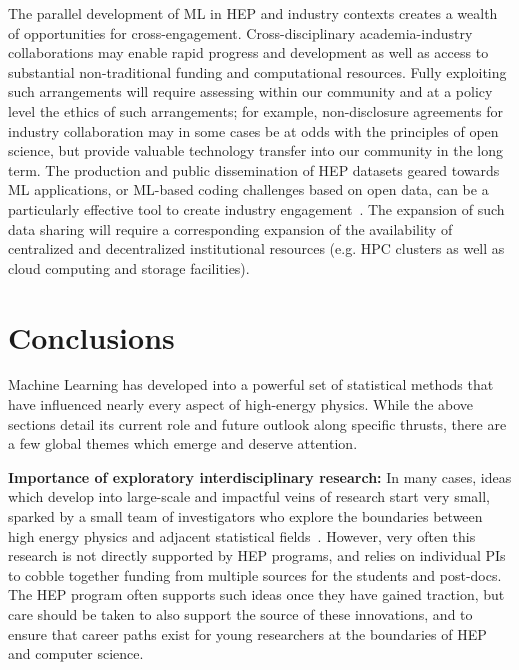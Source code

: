 \documentclass[submission,Phys]{SciPost}
\begin{document}
The parallel development of ML in HEP and industry contexts creates a wealth of opportunities for cross-engagement. Cross-disciplinary academia-industry collaborations may enable rapid progress and development as well as access to substantial non-traditional funding and computational resources. Fully exploiting such arrangements will require assessing within our community and at a policy level the ethics of such arrangements; for example, non-disclosure agreements for industry collaboration may in some cases be at odds with the principles of open science, but provide valuable technology transfer into our community in the long term. The production and public dissemination of HEP datasets geared towards ML applications, or ML-based coding challenges based on open data, can be a particularly effective tool to create industry engagement~\cite{Dvorkin:2022pwo}. The expansion of such data sharing will require a corresponding expansion of the availability of centralized and decentralized institutional resources (e.g. HPC clusters as well as cloud computing and storage facilities).

\section{Conclusions}

Machine Learning has developed into a powerful set of statistical methods that have influenced nearly every aspect of high-energy physics. While the above sections detail its current role and future outlook along specific thrusts, there are a few global themes which emerge and deserve attention.

{\bf Importance of exploratory interdisciplinary research:} In many cases, ideas which develop into large-scale and impactful veins of research start very small, sparked by a small team of investigators who explore the boundaries between high energy physics and adjacent statistical fields~\cite{Baldi:2014kfa, deOliveira:2015xxd, Louppe:2016aov, Komiske:2019fks, Shimmin:2017mfk, Metodiev_2017,Paganini:2017dwg}. However, very often this research is not directly supported by HEP programs, and relies on individual PIs to cobble together funding from multiple sources for the students and post-docs. The HEP program often supports such ideas once they have gained traction, but care should be taken to also support the source of these innovations, and to ensure that career paths exist for young researchers at the boundaries of HEP and computer science.
\end{document}
